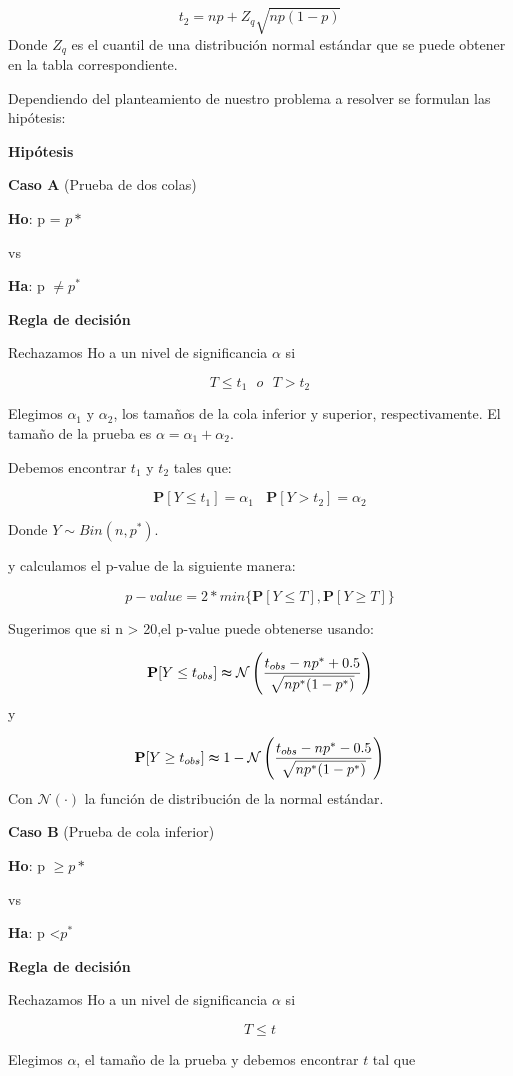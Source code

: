 \documentclass[a4paper,oneside,openany]{book}
\begin{document}
\[t_{2}=np+Z_{q}\sqrt{np(1-p)}\] Donde \(Z_{q}\) es el cuantil de una
distribución normal estándar que se puede obtener en la tabla
correspondiente.

Dependiendo del planteamiento de nuestro problema a resolver se formulan
las hipótesis:

\textbf{Hipótesis}

\textbf{Caso A } (Prueba de dos colas)

\textbf{Ho}: p = \(p*\)

vs

\textbf{Ha}: p \(\neq p^*\)

\textbf{Regla de decisión}

Rechazamos Ho a un nivel de significancia \(\alpha\) si

\[T \leq t_{1} \ \ \ o \ \ \ T > t_{2}\]

Elegimos \(\alpha_{1}\) y \(\alpha_{2}\), los tamaños de la cola
inferior y superior, respectivamente. El tamaño de la prueba es
\(\alpha=\alpha_{1}+\alpha_{2}\).

Debemos encontrar \(t_{1}\) y \(t_{2}\) tales que:

\[\mathbf{P}[Y \leq t_{1}]=\alpha_{1} \ \ \ \ \mathbf{P}[Y > t_{2}]=\alpha_{2}\]

Donde \(Y \sim Bin (n,p^*)\).

y calculamos el p-value de la siguiente manera:

\[p-value=2*min \{ \mathbf{P}[Y\leq T],\mathbf{P}[Y \geq T] \}\]

Sugerimos que si n \textgreater{} 20,el p-value puede obtenerse usando:

\[\mathbf{P}[Y\leq t_{obs}] \thickapprox \mathcal{N} \left(\frac{t_{obs}-np^*+0.5}{\sqrt{np^*(1-p^*)}}\right)\]
y

\[\mathbf{P}[Y\geq t_{obs}] \thickapprox 1-\mathcal{N} \left(\frac{t_{obs}-np^*-0.5}{\sqrt{np^*(1-p^*)}}\right)\]
Con \(\mathcal{N}(\cdot)\) la función de distribución de la normal
estándar.

\textbf{Caso B} (Prueba de cola inferior)

\textbf{Ho}: p \(\geq p*\)

vs

\textbf{Ha}: p \textless{}\(p^*\)

\textbf{Regla de decisión}

Rechazamos Ho a un nivel de significancia \(\alpha\) si

\[T \leq t\]

Elegimos \(\alpha\), el tamaño de la prueba y debemos encontrar \(t\)
tal que
\end{document}
